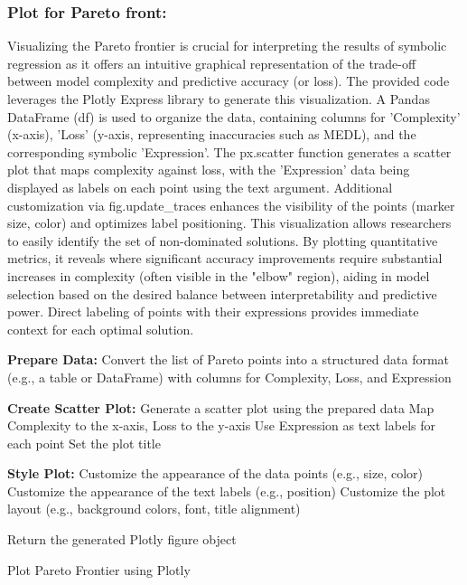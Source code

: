 \documentclass{article}
\begin{document}
\subsubsection{Plot for Pareto front:}



Visualizing the Pareto frontier is crucial for interpreting the results of symbolic regression as it offers an intuitive graphical representation of the trade-off between model complexity and predictive accuracy (or loss). The provided code leverages the Plotly Express library to generate this visualization. A Pandas DataFrame (df) is used to organize the data, containing columns for 'Complexity' (x-axis), 'Loss' (y-axis, representing inaccuracies such as MEDL), and the corresponding symbolic 'Expression'. The px.scatter function generates a scatter plot that maps complexity against loss, with the 'Expression' data being displayed as labels on each point using the text argument. Additional customization via fig.update_traces enhances the visibility of the points (marker size, color) and optimizes label positioning. This visualization allows researchers to easily identify the set of non-dominated solutions. By plotting quantitative metrics, it reveals where significant accuracy improvements require substantial increases in complexity (often visible in the "elbow" region), aiding in model selection based on the desired balance between interpretability and predictive power. Direct labeling of points with their expressions provides immediate context for each optimal solution.\\



\begin{algorithm}[H]
\SetAlgoLined %

\textbf{Prepare Data:}\;
Convert the list of Pareto points into a structured data format (e.g., a table or DataFrame) with columns for Complexity, Loss, and Expression\;

\textbf{Create Scatter Plot:}\;
Generate a scatter plot using the prepared data\;
Map Complexity to the x-axis, Loss to the y-axis\;
Use Expression as text labels for each point\;
Set the plot title\;

\textbf{Style Plot:}\;
Customize the appearance of the data points (e.g., size, color)\;
Customize the appearance of the text labels (e.g., position)\;
Customize the plot layout (e.g., background colors, font, title alignment)\;

Return the generated Plotly figure object\;

\caption{Plot Pareto Frontier using Plotly}
\label{alg:plot_pareto_frontier} %
\end{algorithm}
\end{document}

